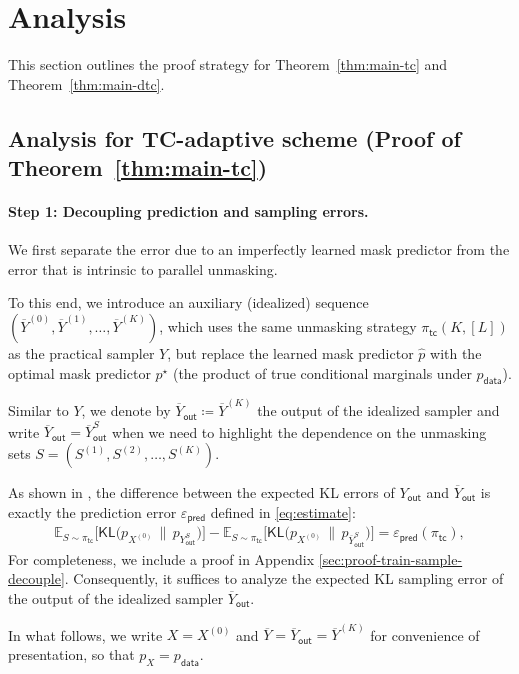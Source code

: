 \documentclass[english]{article}
\newcommand{\defn}{\coloneqq}
\newcommand{\ol}{\overline}
\newcommand{\wh}{\widehat}
\newcommand{\data}{\mathsf{data}}
\newcommand{\veps}{\varepsilon}
\newcommand{\tc}{\mathsf{tc}}
\newcommand{\train}{\mathsf{pred}}
\newcommand{\out}{\mathsf{out}}
\begin{document}
\section{Analysis}
\label{sec:analysis}

This section outlines the proof strategy for Theorem~\ref{thm:main-tc} and Theorem~\ref{thm:main-dtc}.
\subsection{Analysis for TC-adaptive scheme (Proof of Theorem~\ref{thm:main-tc})}
\label{sec:analysis-tc}
\paragraph{Step 1: Decoupling prediction and sampling errors.}

We first separate the error due to an imperfectly learned mask predictor from the error that is intrinsic to parallel unmasking.

To this end, we introduce an auxiliary (idealized) sequence $(\overline Y^{(0)}, \overline Y^{(1)},\dots,\overline Y^{(K)})$, which uses the same unmasking strategy $\pi_\tc(K, [L])$ as the practical sampler $Y$, but replace the learned mask predictor $\wh p$ with the optimal mask predictor $p^\star$ (the product of true conditional marginals under $p_\data$). 

Similar to $Y$, we denote by $\ol Y_\out \defn \overline Y^{(K)}$ the output of the idealized sampler and write $\ol Y_\out = \overline Y_\out^S$ when we need to highlight the dependence on the unmasking sets $S = (S^{(1)}, S^{(2)}, \ldots, S^{(K)})$.

As shown in \citet{li2025breaking}, the difference between the expected KL errors of $Y_\out$ and $\overline Y_\out$ is exactly the prediction error $\veps_\train$ defined in \eqref{eq:estimate}:
\begin{align}\label{eq:train-sample-decouple}
\mathbb{E}_{S\sim \pi_\tc}\Big[\mathsf{KL} \big(p_{X^{(0)}} \,\|\, p_{Y_\out^S})\Big] - \mathbb{E}_{S\sim \pi_\tc}\Big[\mathsf{KL}(p_{X^{(0)}} \,\|\, p_{\overline Y_\out^S} \big)\Big]
 = \varepsilon_\train(\pi_\tc),
\end{align}
For completeness, we include a proof in Appendix \ref{sec:proof-train-sample-decouple}.
Consequently, it suffices to analyze the expected KL sampling error of the output of the idealized sampler $\overline Y_\out$.

In what follows, we write $X = X^{(0)}$ and $\ol Y = \ol Y_\out = \overline Y^{(K)}$ for convenience of presentation, so that $p_X = p_\data$.
\end{document}
